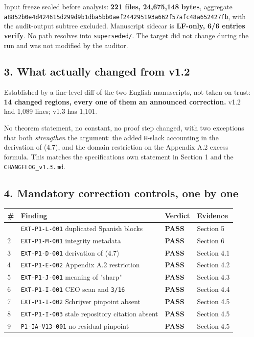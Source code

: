 \documentclass[
  9pt,
  a4paper,
]{article}
\newcounter{none} %
\begin{document}
Input freeze sealed before analysis: \textbf{221 files, 24,675,148
bytes}, aggregate
\texttt{a8852b0e4d424615d299d9b1dba5bb0aef244295193a662f57afc48a652427fb},
with the audit-output subtree excluded. Manuscript sidecar is
\textbf{LF-only, 6/6 entries verify}. No path resolves into
\texttt{superseded/}. The target did not change during the run and was
not modified by the auditor.

\subsection{3. What actually changed from
v1.2}\label{3-what-actually-changed-from-v12}

Established by a line-level diff of the two English manuscripts, not
taken on trust: \textbf{14 changed regions, every one of them an
announced correction.} v1.2 had 1,089 lines; v1.3 has 1,101.

No theorem statement, no constant, no proof step changed, with two
exceptions that both \emph{strengthen} the argument: the added
\texttt{H}-slack accounting in the derivation of (4.7), and the domain
restriction on the Appendix A.2 excess formula. This matches the
specification\textquotesingle s own statement in Section 1 and the
\texttt{CHANGELOG\_v1.3.md}.

\subsection{4. Mandatory correction controls, one by
one}\label{4-mandatory-correction-controls-one-by-one}

{\def\LTcaptype{none} %
\begin{longtable}[]{@{}llll@{}}
\toprule\noalign{}
\# & Finding & Verdict & Evidence \\
\midrule\noalign{}
\endhead
\bottomrule\noalign{}
\endlastfoot
1 & \texttt{EXT-P1-L-001} duplicated Spanish blocks & \textbf{PASS} &
Section 5 \\
2 & \texttt{EXT-P1-M-001} integrity metadata & \textbf{PASS} & Section
6 \\
3 & \texttt{EXT-P1-D-001} derivation of (4.7) & \textbf{PASS} & Section
4.1 \\
4 & \texttt{EXT-P1-E-002} Appendix A.2 restriction & \textbf{PASS} &
Section 4.2 \\
5 & \texttt{EXT-P1-J-001} meaning of "sharp" & \textbf{PASS} & Section
4.3 \\
6 & \texttt{EXT-P1-I-001} CEO scan and \texttt{3/16} & \textbf{PASS} &
Section 4.4 \\
7 & \texttt{EXT-P1-I-002} Schrijver pinpoint absent & \textbf{PASS} &
Section 4.5 \\
8 & \texttt{EXT-P1-I-003} stale repository citation absent &
\textbf{PASS} & Section 4.5 \\
9 & \texttt{P1-IA-V13-001} no residual pinpoint & \textbf{PASS} &
Section 4.5 \\
\end{longtable}
}
\end{document}
